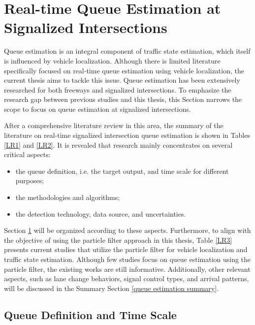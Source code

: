 \section{Real-time Queue Estimation at Signalized Intersections}\label{Queue Estimation-LR}
Queue estimation is an integral component of traffic state estimation, which itself is influenced by vehicle localization. Although there is limited literature specifically focused on real-time queue estimation using vehicle localization, the current thesis aims to tackle this issue. Queue estimation has been extensively researched for both freeways and signalized intersections. To emphasize the research gap between previous studies and this thesis, this Section narrows the scope to focus on queue estimation at signalized intersections.

After a comprehensive literature review in this area, the summary of the literature on real-time signalized intersection queue estimation is shown in Tables \ref{LR1} and \ref{LR2}. It is revealed that research mainly concentrates on several critical aspects: 
\begin{itemize}
    \item the queue definition, i.e. the target output, and time scale for different purposes;
    \item the methodologies and algorithms;
    \item the detection technology, data source, and uncertainties.
\end{itemize}
Section \ref{Queue Estimation-LR} will be organized according to these aspects. Furthermore, to align with the objective of using the particle filter approach in this thesis, Table \ref{LR3} presents current studies that utilize the particle filter for vehicle localization and traffic state estimation. Although few studies focus on queue estimation using the particle filter, the existing works are still informative. Additionally, other relevant aspects, such as lane change behaviors, signal control types, and arrival patterns, will be discussed in the Summary Section \ref{queue estimation summary}.



\subsection{Queue Definition and Time Scale}

